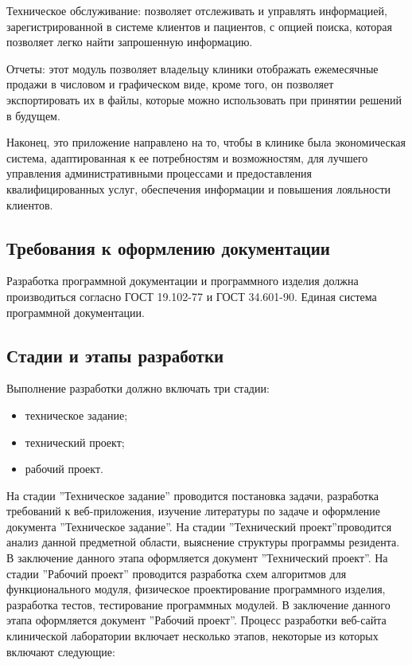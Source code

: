 Техническое обслуживание: позволяет отслеживать и управлять информацией, зарегистрированной в системе клиентов и пациентов, с опцией поиска, которая позволяет легко найти запрошенную информацию.

Отчеты: этот модуль позволяет владельцу клиники отображать ежемесячные продажи в числовом и графическом виде, кроме того, он позволяет экспортировать их в файлы, которые можно использовать при принятии решений в будущем.

Наконец, это приложение направлено на то, чтобы в клинике была экономическая система, адаптированная к ее потребностям и возможностям, для лучшего управления административными процессами и предоставления квалифицированных услуг, обеспечения информации и повышения лояльности клиентов.

\subsection{Требования к оформлению документации}

Разработка программной документации и программного изделия должна производиться согласно ГОСТ 19.102-77 и ГОСТ 34.601-90. Единая система программной документации.

\subsection{Стадии и этапы разработки}

Выполнение разработки должно включать три стадии:
\begin{itemize}
\item техническое задание;
\item технический проект;
\item рабочий проект.
\end{itemize}

На стадии ”Техническое задание” проводится постановка задачи, разработка требований к веб-приложения, изучение литературы по задаче и оформление документа ”Техническое задание”. На стадии ”Технический проект”проводится анализ данной предметной области, выяснение структуры программы резидента. 
В заключение данного этапа оформляется документ ”Технический проект”. На стадии ”Рабочий проект” проводится разработка схем алгоритмов для функционального модуля, физическое проектирование программного изделия, разработка тестов, тестирование программных модулей. В заключение данного этапа оформляется документ ”Рабочий проект”.
Процесс разработки веб-сайта клинической лаборатории включает несколько этапов, некоторые из которых включают следующие:

